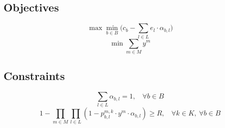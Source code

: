 \documentclass{article}
\begin{document}
\subsection{Objectives}
\begin{equation}
	\max \min_{b \in B} \big( c_{b} - \sum_{l \in L} e_{l} \cdot \alpha_{b, l} \big)
	\label{eq:maxMinEC}
\end{equation}
\begin{equation}
	\min \sum_{m \in M} y^{m}
	\label{eq:minM}
\end{equation}

\subsection{Constraints}
\begin{equation}
	\sum_{l \in L} \alpha_{b, l} = 1,~~~~\forall b \in B
	\label{eq:powLvSelection}
\end{equation}
\begin{equation}
	1 - \prod_{m \in M} \prod_{l \in L} (1 - p^{m, k}_{b, l} \cdot y^{m} \cdot \alpha_{b, l}) \ge R,~~~~\forall k \in K,~\forall b \in B
	\label{eq:coveringProb}
\end{equation}
\end{document}
